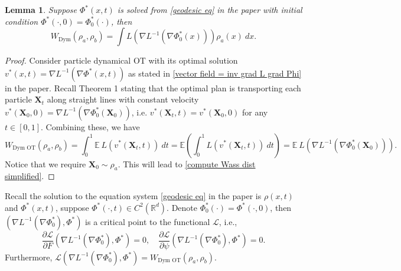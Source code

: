\documentclass{article}
\newtheorem{lemma}{Lemma}
\newenvironment{customthm}[1]
  {\renewcommand\theinnercustomthm{#1}\innercustomthm}
  {\endinnercustomthm}
\begin{document}
\begin{lemma}\label{simplify wasserstein}
 Suppose $\Phi^*(x,t)$ is solved from \eqref{geodesic eq} in the paper with initial condition $\Phi^*(\cdot, 0) = \Phi_0^*(\cdot)$, then 
 \begin{equation}
    W_{\textrm{Dym}}(\rho_a, \rho_b) = \int L(\nabla L^{-1}(\nabla\Phi_0^*(x)))\rho_a(x)~dx.  \label{compute Wass dist simplified}
 \end{equation}
\end{lemma}
\begin{proof}
   Consider particle dynamical OT with its optimal solution $ {v}^*(x,t) = \nabla L^{-1}(\nabla\Phi^*(x, t))$ as stated in \eqref{vector field = inv grad L grad Phi} in the paper. Recall Theorem 1 stating that the optimal plan is transporting each particle $\boldsymbol{X}_t$ along straight lines with constant velocity $ {v}^*(\boldsymbol{X}_0, 0) = \nabla L^{-1}(\nabla\Phi_0^*(\boldsymbol{X}_0))$, i.e. $ {v}^*(\boldsymbol{X}_t, t) =  {v}^*(\boldsymbol{X}_0, 0)$ for any $t\in [0,1]$. Combining these, we have
   \begin{equation*}
      W_{\textrm{Dym OT}}(\rho_a, \rho_b) = \int_0^1\mathbb{E}~ L( {v}^*(\boldsymbol{X}_t,t))~dt = \mathbb{E}\left(\int_0^1 L( {v}^*(\boldsymbol{X}_t,t))~dt\right)=\mathbb{E}~L(\nabla L^{-1}(\nabla\Phi_0^*(\boldsymbol{X}_0))).
   \end{equation*}
   Notice that we require $\boldsymbol{X}_0\sim\rho_a$. This will lead to \eqref{compute Wass dist simplified}.
\end{proof}





\begin{customthm}{2}
Recall the solution to the equation system \eqref{geodesic eq} in the paper is $\rho(x,t)$ and $\Phi^*(x,t)$, suppose $\Phi^*(\cdot, t)\in C^2(\mathbb{R}^d)$. Denote $\Phi_0^*(\cdot) = \Phi^*(\cdot,0)$, then $(\nabla L^{-1}(\nabla \Phi_0^*), \Phi^*)$ is a critical point to the functional $\mathcal{L}$, i.e.,
  \[ \frac{\partial \mathcal{L}}{\partial {F}}(\nabla L^{-1}(\nabla \Phi_0^*),\Phi^*) = 0, \quad \frac{\partial \mathcal{L}}{\partial \psi}(\nabla L^{-1}(\nabla \Phi_0^*),\Phi^*) = 0.\]
Furthermore,  $\mathcal{L}(\nabla L^{-1}(\nabla\Phi_0^*), \Phi^*)=W_{\textrm{Dym OT}}(\rho_a,\rho_b)$.
\end{customthm}
\end{document}
